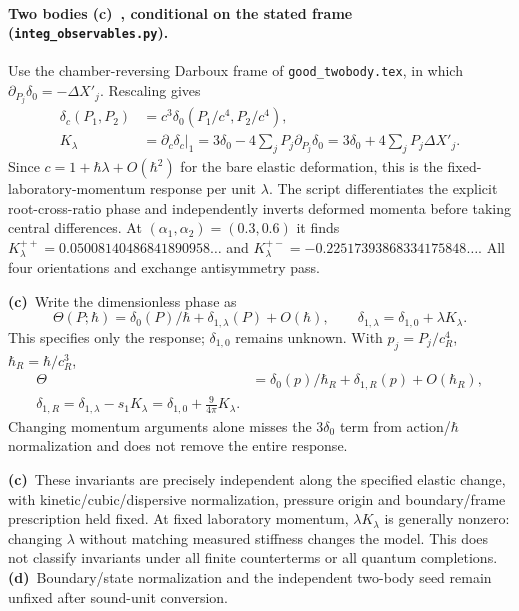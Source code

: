 \documentclass[11pt,a4paper]{article}
\newcommand{\C}{\textbf{(c)}\ }
\newcommand{\D}{\textbf{(d)}\ }
\newcommand{\file}[1]{\nolinkurl{#1}}
\newcommand{\obs}{\file{integ_observables.py}}
\begin{document}
\paragraph{Two bodies \C, conditional on the stated frame (\obs).}
Use the chamber-reversing Darboux frame of \file{good_twobody.tex}, in
which $\partial_{P_j}\delta_0=-\Delta X'_j$. Rescaling gives
\begin{align}
 \delta_c(P_1,P_2)&=c^3\delta_0(P_1/c^4,P_2/c^4),\\
 K_\lambda&=\left.\partial_c\delta_c\right|_1
  =3\delta_0-4\sum_jP_j\partial_{P_j}\delta_0
  =3\delta_0+4\sum_jP_j\Delta X'_j.\label{K}
\end{align}
Since $c=1+\hbar\lambda+O(\hbar^2)$ for the bare elastic deformation,
this is the fixed-laboratory-momentum response per unit $\lambda$.
The script differentiates the explicit root-cross-ratio phase and
independently inverts deformed momenta before taking central differences.
At $(\alpha_1,\alpha_2)=(0.3,0.6)$ it finds
$K^{++}_\lambda=0.05008140486841890958\ldots$ and
$K^{+-}_\lambda=-0.22517393868334175848\ldots$.
All four orientations and exchange antisymmetry pass.

\C Write the dimensionless phase as
\begin{equation}
 \Theta(P;\hbar)=\delta_0(P)/\hbar+\delta_{1,\lambda}(P)+O(\hbar),
 \qquad\delta_{1,\lambda}=\delta_{1,0}+\lambda K_\lambda.
\end{equation}
This specifies only the response; $\delta_{1,0}$ remains unknown.
With $p_j=P_j/c_R^4$, $\hbar_R=\hbar/c_R^3$,
\begin{align}
 \Theta&=\delta_0(p)/\hbar_R+\delta_{1,R}(p)+O(\hbar_R),\\
 \boxed{\delta_{1,R}=\delta_{1,\lambda}-s_1K_\lambda
       =\delta_{1,0}+\frac9{4\pi}K_\lambda.}\label{phaseinv}
\end{align}
Changing momentum arguments alone misses the $3\delta_0$ term from
action/$\hbar$ normalization and does not remove the entire response.

\C These invariants are precisely independent along the specified elastic
change, with kinetic/cubic/dispersive normalization, pressure origin and
boundary/frame prescription held fixed. At fixed laboratory momentum,
$\lambda K_\lambda$ is generally nonzero: changing $\lambda$ without
matching measured stiffness changes the model. This does not classify
invariants under all finite counterterms or all quantum completions.
\D Boundary/state normalization and the independent two-body seed remain
unfixed after sound-unit conversion.
\end{document}
